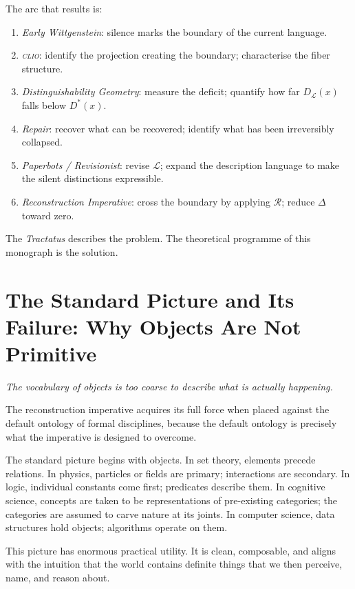 \documentclass[12pt, letterpaper]{article}
\theoremstyle{remark}
\newcommand{\clio}{\textsc{clio}}
\begin{document}
The arc that results is:
\begin{enumerate}
  \item \textit{Early Wittgenstein}: silence marks the boundary of the
    current language.
  \item \textit{\clio{}}: identify the projection creating the boundary;
    characterise the fiber structure.
  \item \textit{Distinguishability Geometry}: measure the deficit; quantify
    how far $D_{\mathcal{L}}(x)$ falls below $D^*(x)$.
  \item \textit{Repair}: recover what can be recovered; identify what has
    been irreversibly collapsed.
  \item \textit{Paperbots / Revisionist}: revise $\mathcal{L}$; expand
    the description language to make the silent distinctions expressible.
  \item \textit{Reconstruction Imperative}: cross the boundary by applying
    $\mathcal{R}$; reduce $\Delta$ toward zero.
\end{enumerate}
The \textit{Tractatus} describes the problem.  The theoretical programme
of this monograph is the solution.

\section{The Standard Picture and Its Failure: Why Objects Are Not Primitive}

\epigraph{\itshape The vocabulary of objects is too coarse to describe what
is actually happening.}{}

The reconstruction imperative acquires its full force when placed against the
default ontology of formal disciplines, because the default ontology is
precisely what the imperative is designed to overcome.

The standard picture begins with objects.  In set theory, elements precede
relations.  In physics, particles or fields are primary; interactions are
secondary.  In logic, individual constants come first; predicates describe
them.  In cognitive science, concepts are taken to be representations of
pre-existing categories; the categories are assumed to carve nature at its
joints.  In computer science, data structures hold objects; algorithms
operate on them.

This picture has enormous practical utility.  It is clean, composable, and
aligns with the intuition that the world contains definite things that we
then perceive, name, and reason about.
\end{document}
